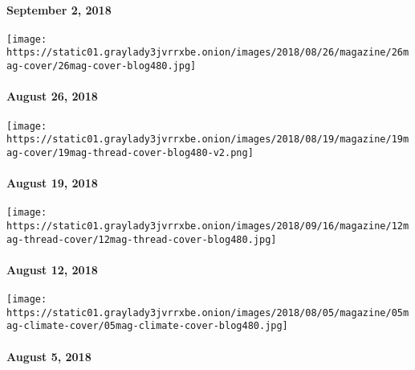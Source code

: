 \hypertarget{september-2-2018}{%
\paragraph{September 2, 2018}\label{september-2-2018}}

\href{https://www.nytimes3xbfgragh.onion/issue/magazine/2018/08/24/the-82618-issue}{}

\texttt{[image: https://static01.graylady3jvrrxbe.onion/images/2018/08/26/magazine/26mag-cover/26mag-cover-blog480.jpg]}

\hypertarget{august-26-2018}{%
\paragraph{August 26, 2018}\label{august-26-2018}}

\href{https://www.nytimes3xbfgragh.onion/issue/magazine/2018/08/24/the-81918-issue}{}

\texttt{[image: https://static01.graylady3jvrrxbe.onion/images/2018/08/19/magazine/19mag-cover/19mag-thread-cover-blog480-v2.png]}

\hypertarget{august-19-2018}{%
\paragraph{August 19, 2018}\label{august-19-2018}}

\href{https://www.nytimes3xbfgragh.onion/issue/magazine/2018/08/24/the-81218-issue}{}

\texttt{[image: https://static01.graylady3jvrrxbe.onion/images/2018/09/16/magazine/12mag-thread-cover/12mag-thread-cover-blog480.jpg]}

\hypertarget{august-12-2018}{%
\paragraph{August 12, 2018}\label{august-12-2018}}

\href{https://www.nytimes3xbfgragh.onion/interactive/2018/08/01/magazine/climate-change-losing-earth.html}{}

\texttt{[image: https://static01.graylady3jvrrxbe.onion/images/2018/08/05/magazine/05mag-climate-cover/05mag-climate-cover-blog480.jpg]}

\hypertarget{august-5-2018}{%
\paragraph{August 5, 2018}\label{august-5-2018}}

